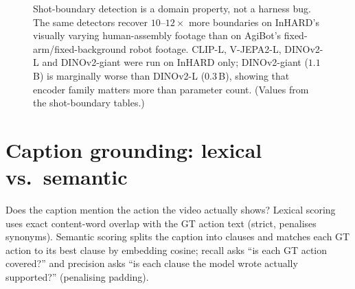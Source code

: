 \documentclass[10pt,letterpaper]{article}
\begin{document}
\begin{figure}[H]
\centering
{}
\caption{Shot-boundary detection is a domain property, not a harness bug. The same detectors
recover $10$--$12\times$ more boundaries on InHARD's visually varying human-assembly footage than
on AgiBot's fixed-arm/fixed-background robot footage. CLIP-L, V-JEPA2-L, DINOv2-L and DINOv2-giant
were run on InHARD only; DINOv2-giant ($1.1$\,B) is marginally worse than DINOv2-L ($0.3$\,B),
showing that encoder family matters more than parameter count. (Values from the shot-boundary
tables.)}
\end{figure}

\section{Caption grounding: lexical vs.\ semantic}\label{sec:grounding}

Does the caption mention the action the video actually shows? Lexical scoring uses exact
content-word overlap with the GT action text (strict, penalises synonyms). Semantic scoring
splits the caption into clauses and matches each GT action to its best clause by embedding
cosine; recall asks ``is each GT action covered?'' and precision asks ``is each clause the model
wrote actually supported?'' (penalising padding).
\end{document}
